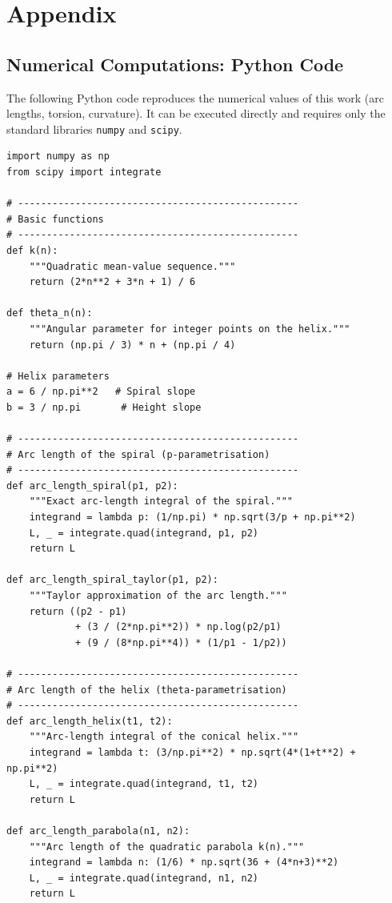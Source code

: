 \chapter{Appendix}

\section{Numerical Computations: Python Code}

The following Python code reproduces the numerical values of this work
(arc lengths, torsion, curvature). It can be executed directly and
requires only the standard libraries \texttt{numpy} and \texttt{scipy}.

\begin{verbatim}
import numpy as np
from scipy import integrate

# -------------------------------------------------
# Basic functions
# -------------------------------------------------
def k(n):
    """Quadratic mean-value sequence."""
    return (2*n**2 + 3*n + 1) / 6

def theta_n(n):
    """Angular parameter for integer points on the helix."""
    return (np.pi / 3) * n + (np.pi / 4)

# Helix parameters
a = 6 / np.pi**2   # Spiral slope
b = 3 / np.pi       # Height slope

# -------------------------------------------------
# Arc length of the spiral (p-parametrisation)
# -------------------------------------------------
def arc_length_spiral(p1, p2):
    """Exact arc-length integral of the spiral."""
    integrand = lambda p: (1/np.pi) * np.sqrt(3/p + np.pi**2)
    L, _ = integrate.quad(integrand, p1, p2)
    return L

def arc_length_spiral_taylor(p1, p2):
    """Taylor approximation of the arc length."""
    return ((p2 - p1)
            + (3 / (2*np.pi**2)) * np.log(p2/p1)
            + (9 / (8*np.pi**4)) * (1/p1 - 1/p2))

# -------------------------------------------------
# Arc length of the helix (theta-parametrisation)
# -------------------------------------------------
def arc_length_helix(t1, t2):
    """Arc-length integral of the conical helix."""
    integrand = lambda t: (3/np.pi**2) * np.sqrt(4*(1+t**2) + np.pi**2)
    L, _ = integrate.quad(integrand, t1, t2)
    return L

def arc_length_parabola(n1, n2):
    """Arc length of the quadratic parabola k(n)."""
    integrand = lambda n: (1/6) * np.sqrt(36 + (4*n+3)**2)
    L, _ = integrate.quad(integrand, n1, n2)
    return L


\end{verbatim}
